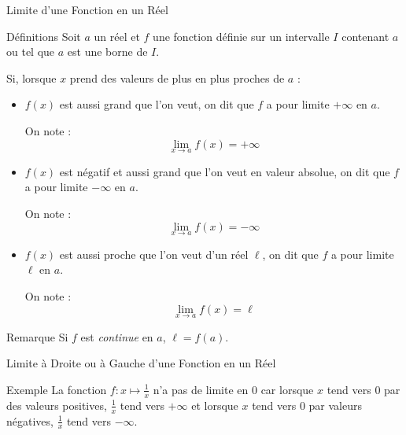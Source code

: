 \documentclass{coursbook}
\begin{document}
    \begin{Gpartie}{Limite d'une Fonction en un Réel} 
        \begin{Spartie}{Définitions} 
            Soit $a$ un réel et $f$ une fonction définie sur un intervalle $I$ contenant $a$ ou tel que $a$ est une borne de $I$.

            Si, lorsque $x$ prend des valeurs de plus en plus proches de $a$ :
            \begin{itemize}
                \item $f(x)$ est aussi grand que l'on veut, on dit que $f$ a pour limite $+\infty$ en $a$.

                On note : \[\boxed{\lim\limits_{x\to a}f(x)=+\infty}\]
                \begin{center}
                    \parbox{\linewidth}{}
                \end{center}
                \item $f(x)$ est négatif et aussi grand que l'on veut en valeur absolue, on dit que $f$ a pour limite $-\infty$ en $a$.

                On note : \[\boxed{\lim\limits_{x\to a}f(x)=-\infty}\]
                \item $f(x)$ est aussi proche que l'on veut d'un réel $\ell$, on dit que $f$ a pour limite $\ell$ en $a$.
                
                On note : \[\boxed{\lim\limits_{x\to a}f(x)=\ell}\]
            \end{itemize}
            \begin{SSpartie}{Remarque} 
                Si $f$ est \emph{continue} en $a$, $\ell=f(a)$.
            \end{SSpartie}
        \end{Spartie}
        \pagebreak
        \begin{Spartie}{Limite à Droite ou à Gauche d'une Fonction en un Réel} 
            \begin{SSpartie}{Exemple} 
                La fonction $f:x\mapsto\frac{1}{x}$ n'a pas de limite en $0$ car lorsque $x$ tend vers $0$ par des valeurs positives, $\frac{1}{x}$ tend vers $+\infty$ et lorsque $x$ tend vers $0$ par valeurs négatives, $\frac{1}{x}$ tend vers $-\infty$.


\end{SSpartie}
\end{Spartie}
\end{Gpartie}
\end{document}
